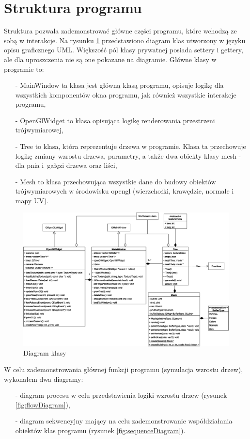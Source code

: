 \documentclass[a4paper,twoside,12pt]{report}
\begin{document}
\section{Struktura programu}

Struktura pozwala zademonstrować główne części programu, 
które wchodzą ze sobą w interakcje. Na rysunku \ref{fig:classDiagram} 
przedstawiono diagram klas utworzony w języku opisu graficznego UML. 
Większość pól klasy prywatnej posiada settery i gettery, 
ale dla uproszczenia nie są one pokazane na diagramie. 
Główne klasy w programie to:
\begin{itemize}
	\item[-] MainWindow ta klasa jest główną klasą programu, opisuje logikę dla wszystkich komponentów okna programu, jak również wszystkie interakcje programu,
	\item[-] OpenGlWidget to klasa opisująca logikę renderowania przestrzeni trójwymiarowej,
	\item[-] Tree to klasa, która reprezentuje drzewa w programie. Klasa ta przechowuje logikę zmiany wzrostu drzewa, parametry, a także dwa obiekty klasy mesh - dla pnia i~gałęzi drzewa oraz liści,
	\item[-] Mesh to klasa przechowująca wszystkie dane do budowy obiektów trójwymiarowych w środowisku opengl (wierzchołki, krawędzie, normale i mapy UV).
\end{itemize}

\begin{figure}[H]
	\centering\includegraphics[width=15.5cm]{grafika/diagrams/class}
	\caption{Diagram klasy}
    \label{fig:classDiagram}
\end{figure}

W celu zademonstrowania głównej funkcji programu 
(symulacja wzrostu drzew), wykonałem dwa diagramy: 
\begin{itemize}[noitemsep,topsep=0pt]
	\item[-] diagram procesu w celu przedstawienia logiki wzrostu drzew (rysunek \ref{fig:flowDiagram}),
	\item[-] diagram sekwencyjny mający na celu zademonstrowanie współdziałania obiektów klas programu (rysunek \ref{fig:sequenceDiagram}).
\end{itemize}
\end{document}
